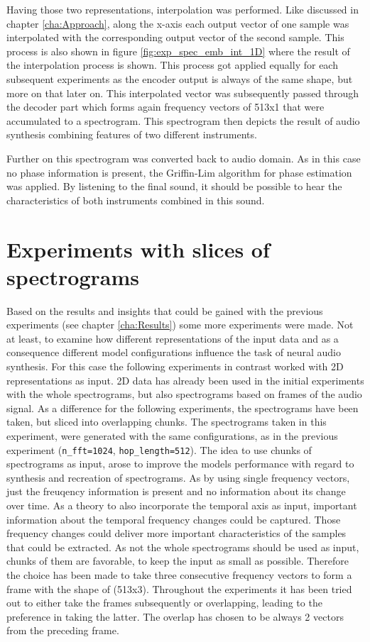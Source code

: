 Having those two representations, interpolation was performed. Like discussed in chapter \ref{cha:Approach}, along the x-axis each output vector of one sample was interpolated with the corresponding output vector of the second sample. This process is also shown in figure \ref{fig:exp_spec_emb_int_1D} where the result of the interpolation process is shown. This process got applied equally for each subsequent experiments as the encoder output is always of the same shape, but more on that later on.
This interpolated vector was subsequently passed through the decoder part which forms again frequency vectors of 513x1 that were accumulated to a spectrogram. This spectrogram then depicts the result of audio synthesis combining features of two different instruments.

Further on this spectrogram was converted back to audio domain. As in this case no phase information is present, the Griffin-Lim algorithm \cite{Griffin1984} for phase estimation was applied. By listening to the final sound, it should be possible to hear the characteristics of both instruments combined in this sound.

\section{Experiments with slices of spectrograms}
Based on the results and insights that could be gained with the previous experiments (see chapter \ref{cha:Results}) some more experiments were made. Not at least, to examine how different representations of the input data and as a consequence different model configurations influence the task of neural audio synthesis. For this case the following experiments in contrast worked with 2D representations as input. 2D data has already been used in the initial experiments with the whole spectrograms, but also spectrograms based on frames of the audio signal. As a difference for the following experiments, the spectrograms have been taken, but sliced into overlapping chunks. The spectrograms taken in this experiment, were generated with the same configurations, as in the previous experiment (\texttt{n\_fft=1024}, \texttt{hop\_length=512}). The idea to use chunks of spectrograms as input, arose to improve the models performance with regard to synthesis and recreation of spectrograms. As by using single frequency vectors, just the freuqency information is present and no information about its change over time. As a theory to also incorporate the temporal axis as input, important information about the temporal frequency changes could be captured. Those frequency changes could deliver more important characteristics of the samples that could be extracted. As not the whole spectrograms should be used as input, chunks of them are favorable, to keep the input as small as possible. Therefore the choice has been made to take three consecutive frequency vectors to form a frame with the shape of (513x3). Throughout the experiments it has been tried out to either take the frames subsequently or overlapping, leading to the preference in taking the latter. The overlap has chosen to be always 2 vectors from the preceding frame. 

